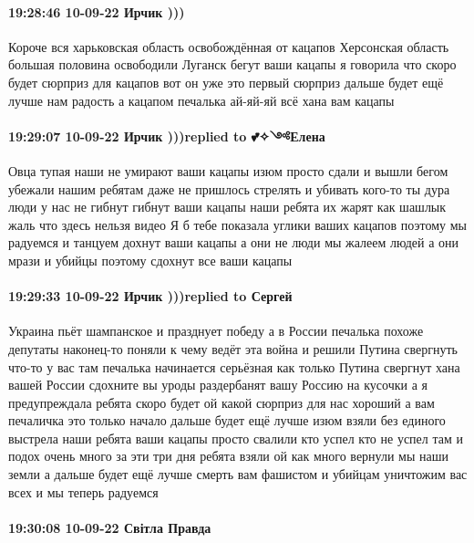 \paragraph{19:28:46 10-09-22 Ирчик )))}

Короче вся харьковская область освобождённая от кацапов Херсонская область
большая половина освободили Луганск бегут ваши кацапы я говорила что скоро
будет сюрприз для кацапов вот он уже это первый сюрприз дальше будет ещё лучше
нам радость а кацапом печалька ай-яй-яй всё хана вам кацапы🤣🤣🤣🤣

\paragraph{19:29:07 10-09-22 Ирчик )))replied to 💕✧༺Елена}

Овца тупая наши не умирают ваши кацапы изюм просто сдали и вышли бегом убежали
нашим ребятам даже не пришлось стрелять и убивать кого-то ты дура люди у нас не
гибнут гибнут ваши кацапы наши ребята их жарят как шашлык жаль что здесь нельзя
видео Я б тебе показала углики ваших кацапов поэтому мы радуемся и танцуем
дохнут ваши кацапы а они не люди мы жалеем людей а они мрази и убийцы поэтому
сдохнут все ваши кацапы🤣🤣🤣

\paragraph{19:29:33 10-09-22 Ирчик )))replied to Сергей}

Украина пьёт шампанское и празднует победу а в России печалька похоже депутаты
наконец-то поняли к чему ведёт эта война и решили Путина свергнуть что-то у вас
там печалька начинается серьёзная как только Путина свергнут хана вашей России
сдохните вы уроды раздербанят вашу Россию на кусочки а я предупреждала ребята
скоро будет ой какой сюрприз для нас хороший а вам печаличка это только начало
дальше будет ещё лучше изюм взяли без единого выстрела наши ребята ваши кацапы
просто свалили кто успел кто не успел там и подох очень много за эти три дня
ребята взяли ой как много вернули мы наши земли а дальше будет ещё лучше смерть
вам фашистом и убийцам уничтожим вас всех и мы теперь радуемся🤣🤣🤣🤣

\paragraph{19:30:08 10-09-22 Світла Правда}

